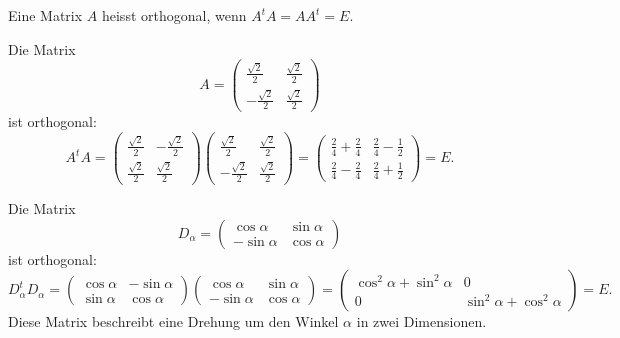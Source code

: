 \begin{definition}
Eine Matrix $A$ heisst orthogonal, wenn $A^tA=AA^t=E$.
\end{definition}

\begin{beispiel}
Die Matrix 
\[
A=
\begin{pmatrix}
\frac{\sqrt{2}}2& \frac{\sqrt{2}}2\\
-\frac{\sqrt{2}}2& \frac{\sqrt{2}}2
\end{pmatrix}
\]
ist orthogonal:
\[
A^tA=
\begin{pmatrix}
\frac{\sqrt{2}}2&-\frac{\sqrt{2}}2\\
\frac{\sqrt{2}}2& \frac{\sqrt{2}}2
\end{pmatrix}
\begin{pmatrix}
\frac{\sqrt{2}}2& \frac{\sqrt{2}}2\\
-\frac{\sqrt{2}}2& \frac{\sqrt{2}}2
\end{pmatrix}
=
\begin{pmatrix}
\frac24+\frac24&\frac24-\frac12\\
\frac24-\frac24&\frac24+\frac12
\end{pmatrix}
=E.
\]
\end{beispiel}
\begin{beispiel}
Die Matrix
\[
D_\alpha
=
\begin{pmatrix}
\cos\alpha&\sin\alpha\\
-\sin\alpha&\cos\alpha
\end{pmatrix}
\]
ist orthogonal:
\[
D_\alpha^tD_\alpha
=
\begin{pmatrix}
\cos\alpha&-\sin\alpha\\
\sin\alpha&\cos\alpha
\end{pmatrix}
\begin{pmatrix}
\cos\alpha&\sin\alpha\\
-\sin\alpha&\cos\alpha
\end{pmatrix}
=
\begin{pmatrix}
\cos^2\alpha+\sin^2\alpha&0\\
0&\sin^2\alpha+\cos^2\alpha
\end{pmatrix}
=E.
\]
Diese Matrix beschreibt eine Drehung um den Winkel $\alpha$
in zwei Dimensionen.
\end{beispiel}

